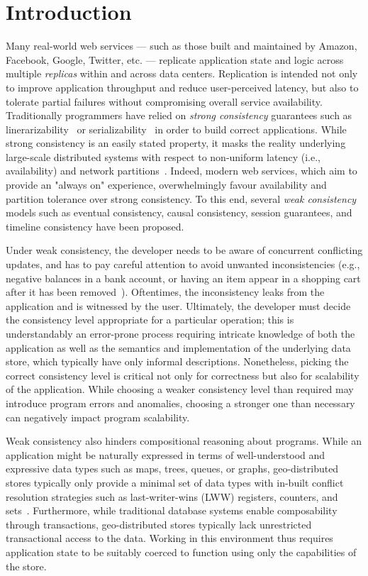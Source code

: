 \section{Introduction}

Many real-world web services --- such as those built and maintained by
Amazon, Facebook, Google, Twitter, etc. --- replicate application state and
logic across multiple \emph{replicas} within and across data
centers. Replication is intended not only to improve application throughput
and reduce user-perceived latency, but also to tolerate partial failures
without compromising overall service availability. Traditionally programmers
have relied on \emph{strong consistency} guarantees such as
linerarizability~\cite{Herlihy1990} or
serializability~\cite{Serializability} in order to build correct
applications.  While strong consistency is an easily stated property, it
masks the reality underlying large-scale distributed systems with respect to
non-uniform latency (i.e., availability) and network
partitions~\cite{Brewer2000,Gilbert2002}. Indeed, modern web services, which aim
to provide an "always on" experience, overwhelmingly favour availability and
partition tolerance over strong consistency. To this end, several \emph{weak
  consistency} models such as eventual consistency, causal consistency,
session guarantees, and timeline consistency have been proposed.

Under weak consistency, the developer needs to be aware of concurrent
conflicting updates, and has to pay careful attention to avoid unwanted
inconsistencies (e.g., negative balances in a bank account, or having an item
appear in a shopping cart after it has been removed~\cite{Dynamo}). Oftentimes,
the inconsistency leaks from the application and is witnessed by the user.
Ultimately, the developer must decide the consistency level appropriate for a
particular operation; this is understandably an error-prone process requiring
intricate knowledge of both the application as well as the semantics and
implementation of the underlying data store, which typically have only informal
descriptions. Nonetheless, picking the correct consistency level is critical
not only for correctness but also for scalability of the application. While
choosing a weaker consistency level than required may introduce program errors
and anomalies, choosing a stronger one than necessary can negatively impact
program scalability.

Weak consistency also hinders compositional reasoning about programs.  While
an application might be naturally expressed in terms of well-understood and
expressive data types such as maps, trees, queues, or graphs,
geo-distributed stores typically only provide a minimal set of data types
with in-built conflict resolution strategies such as last-writer-wins (LWW)
registers, counters, and sets~\cite{Cassandra,DynamoDB}.  Furthermore, while
traditional database systems enable composability through transactions,
geo-distributed stores typically lack unrestricted transactional access to
the data.  Working in this environment thus requires application state to be
suitably coerced to function using only the capabilities of the store.


